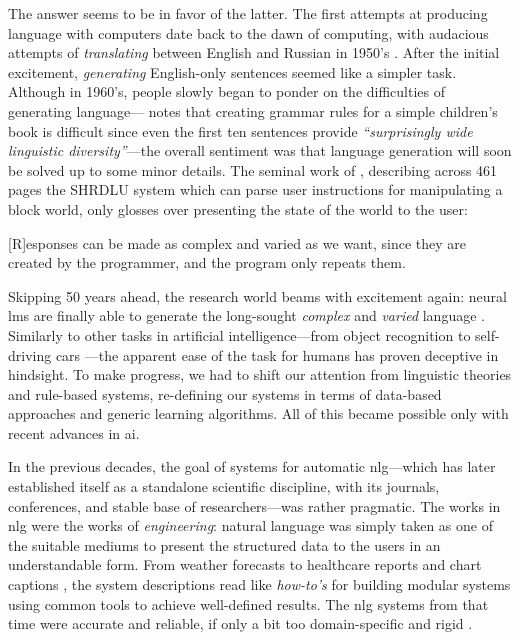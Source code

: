 \documentclass[12pt,notitlepage,a4paper,openright]{report}
\begin{document}
The answer seems to be in favor of the latter. The first attempts at producing language with computers date back to the dawn of computing, with audacious attempts of \textit{translating} between English and Russian in 1950's \cite{sheridan1955research}. After the initial excitement, \textit{generating} English-only sentences seemed like a simpler task. Although in 1960's, people slowly began to ponder on the difficulties of generating language---\citet{yngve1961random} notes that creating grammar rules for a simple children's book is difficult since even the first ten sentences provide \textit{``surprisingly wide linguistic diversity''}---the overall sentiment was that language generation will soon be solved up to some minor details. The seminal work of \citet{winograd1971procedures}, describing  across 461 pages the SHRDLU system which can parse user instructions for manipulating a block world, only glosses over presenting the state of the world to the user:
\begin{pquotation}{\citealp[p.384]{winograd1971procedures}}
  [R]esponses can be made as complex and varied as we want, since they are created by the programmer, and the program only repeats them.
\end{pquotation}
Skipping 50 years ahead, the research world beams with excitement again: neural \acp{lm} are finally able to generate the long-sought \textit{complex} and \textit{varied} language \cite{vaswani2017attention,radford2019language,brown2020language}. Similarly to other tasks in artificial intelligence---from object recognition \cite{papert1966summer} to self-driving cars \cite{autonomouscars}---the apparent ease of the task for humans has proven deceptive in hindsight. To make progress, we had to shift our attention from linguistic theories and rule-based systems, re-defining our systems in terms of data-based approaches and generic learning algorithms. All of this became possible only with recent advances in \ac{ai}.

In the previous decades, the goal of systems for automatic \ac{nlg}---which has later established itself as a standalone scientific discipline, with its journals, conferences, and stable base of researchers---was rather pragmatic.
The works in \ac{nlg} were the works of \textit{engineering}: natural language was simply taken as one of the suitable mediums to present the structured data to the users in an understandable form. From weather forecasts \cite{belzAutomaticGenerationWeather2008} to healthcare reports \cite{portetAutomaticGenerationTextual2009} and chart captions \cite{demirSummarizingInformationGraphics2012}, the system descriptions read like \textit{how-to's} for building modular systems using common tools to achieve well-defined results.
The \ac{nlg} systems from that time were accurate and reliable, if only a bit too domain-specific and rigid \cite{reiterBuildingAppliedNatural1997,gattSurveyStateArt2018}.
\end{document}
